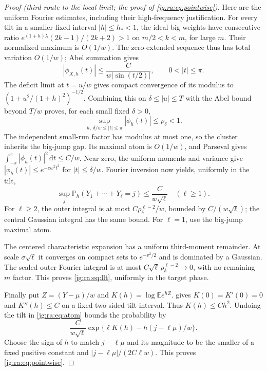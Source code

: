 \documentclass[11pt,a4paper]{article}
\theoremstyle{definition}\newaliascnt{definition}{theorem}
\theoremstyle{remark}\newaliascnt{remark}{theorem}
\newcommand{\dd}{\mathrm d}
\newcommand{\ljP}{\mathbb P}
\newcommand{\ljE}{\mathbb E}
\begin{document}
\begin{proof}[Proof (third route to the local limit; the proof of \eqref{jg:ra:eq:pointwise})]
Here are the uniform Fourier estimates, including their high-frequency
justification. For every tilt in a smaller fixed interval $|h|\le h_*<1$, the
ideal big weights have consecutive ratio $e^{(1+h)\lambda}(2k-1)/(2k+2)>1$ on
$m/2<k<m$, for large $m$. Their normalized maximum is $O(1/w)$. The
zero-extended sequence thus has total variation $O(1/w)$; Abel summation gives
\[
 |\phi_{X,h}(t)|\le\frac{C}{w|\sin(t/2)|},\qquad 0<|t|\le\pi.
\]
The deficit limit at $t=u/w$ gives compact convergence of its modulus to
$(1+u^2/(1+h)^2)^{-1/2}$. Combining this on $\delta\le|u|\le T$ with the Abel
bound beyond $T/w$ proves, for each small fixed $\delta>0$,
\begin{equation}\label{jg:ra:eq:gap}
 \sup_{h,\ \delta/w\le|t|\le\pi}|\phi_h(t)|\le\rho_\delta<1.
\end{equation}
The independent small-run factor has modulus at most one, so the cluster
inherits the big-jump gap. Its maximal atom is $O(1/w)$, and Parseval gives
$\int_{-\pi}^{\pi}|\phi_h(t)|^2\,\dd t\le C/w$. Near zero, the uniform moments
and variance give $|\phi_h(t)|\le e^{-cw^2t^2}$ for $|t|\le\delta/w$. Fourier
inversion now yields, uniformly in the tilt,
\begin{equation}\label{jg:ra:eq:atom}
 \sup_j\ljP_h(Y_1+\cdots+Y_\ell=j)\le\frac{C}{w\sqrt\ell}
 \quad(\ell\ge1).
\end{equation}
For $\ell\ge2$, the outer integral is at most $C\rho_\delta^{\ell-2}/w$,
bounded by $C/(w\sqrt\ell)$; the central Gaussian integral has the same bound.
For $\ell=1$, use the big-jump maximal atom.

The centered characteristic expansion has a uniform third-moment remainder. At
scale $\sigma\sqrt\ell$ it converges on compact sets to $e^{-v^2/2}$ and is
dominated by a Gaussian. The scaled outer Fourier integral is at most
$C\sqrt\ell\,\rho_\delta^{\ell-2}\to0$, with no remaining $m$ factor. This
proves \eqref{jg:ra:eq:llt}, uniformly in the target phase.

Finally put $Z=(Y-\mu)/w$ and $K(h)=\log\ljE e^{hZ}$.
 gives $K(0)=K'(0)=0$ and $K''(h)\le C$ on a fixed
two-sided tilt interval. Thus $K(h)\le Ch^2$. Undoing the tilt in
\eqref{jg:ra:eq:atom} bounds the probability by
\[
 \frac{C}{w\sqrt\ell}\exp\{\ell K(h)-h(j-\ell\mu)/w\}.
\]
Choose the sign of $h$ to match $j-\ell\mu$ and its magnitude to be the smaller
of a fixed positive constant and $|j-\ell\mu|/(2C\ell w)$. This proves
\eqref{jg:ra:eq:pointwise}.
\end{proof}
\end{document}
